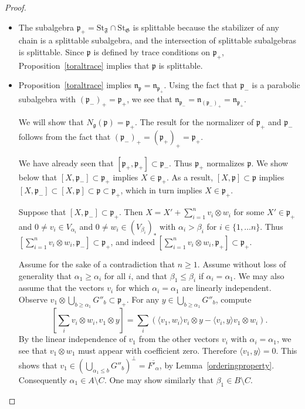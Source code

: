 \documentclass{article}
\newcommand {\St} {\mathrm{St}}
\def\g{\mathfrak {g}}
\def\n{\mathfrak {n}}
\def\p{\mathfrak {p}}
\def\F{\mathfrak{F}}
\def\G{\mathfrak{G}}
\begin{document}
\begin{proof}
\begin{itemize}
\item[(\ref{parta})] The subalgebra $\p_+ = \St_\F \cap \St_\G$ is splittable because the stabilizer of any chain is a splittable subalgebra, and the intersection of splittable subalgebras is splittable.  Since $\p$ is defined by trace conditions on $\p_+$, Proposition~\ref{toraltrace}  implies that $\p$ is splittable.

\item[(\ref{partb})]
Proposition~\ref{toraltrace} implies $\n_\p =  \n_{\p_+}$.  Using the fact that $\p_-$ is a parabolic subalgebra with $(\p_-)_+ = \p_+$, we see that $\n_{\p_-} = \n_{(\p_-)_+} = \n_{\p_+}$.

We will show that $N_\g (\p) = \p_+$.  The result for the normalizer of $\p_+$ and $\p_-$ follows from the fact that $(\p_-)_+ = (\p_+)_+ = \p_+$.

We have already seen that $[\p_+ , \p_+] \subset \p_-$.  Thus $\p_+$ normalizes $\p$.  We show below that $[X , \p_-] \subset \p_+$ implies $X \in \p_+$. 
As a result, $[X , \p] \subset \p$ implies $[X , \p_-] \subset [X, \p] \subset \p \subset \p_+$, which in turn implies $X \in \p_+$.

Suppose that $[X , \p_-] \subset \p_+$.  Then $X = X' + \sum_{i=1}^n v_i \otimes w_i$ for some $X' \in \p_+$ and $0 \neq v_i \in V_{\alpha_i}$ and $0 \neq w_i \in (V_{\beta_i})_*$ with $\alpha_i > \beta_i$ for $i \in \{1 , \ldots n \}$.  Thus $[\sum_{i=1}^n v_i \otimes w_i, \p_-] \subset \p_+$, and indeed
 $[\sum_{i=1}^n v_i \otimes w_i, \p_+] \subset \p_+$.  

Assume for the sake of a contradiction that $n \geq 1$.  Assume without loss of generality that $\alpha_1 \geq \alpha_i$ for all $i$, and that $\beta_1 \leq \beta_i$ if $\alpha_i = \alpha_1$.
We may also assume that the vectors $v_i$ for which $\alpha_i = \alpha_1$ are linearly independent.  Observe $v_1 \otimes \bigcup_{b \geq \alpha_1} G''_b \subset \p_+$.  For any $y \in \bigcup_{b \geq \alpha_1} G''_b$,
compute
$$\left[ \sum_i v_i \otimes w_i , v_1 \otimes y \right] = \sum_i (\langle v_1 , w_i \rangle v_i \otimes y - \langle v_i , y \rangle v_1 \otimes w_i).$$
By the linear independence of $v_1$ from the other vectors $v_i$ with $\alpha_i = \alpha_1$, we see that $v_1 \otimes w_1$ must appear with coefficient zero.  Therefore $\langle v_1 , y \rangle = 0$.  This shows that $v_1 \in (\bigcup_{\alpha_1 \leq b} G''_b)^\perp = \overline{F'_\alpha}$, by Lemma~\ref{orderingproperty}.  Consequently $\alpha_1 \in A \setminus C$.  One may show similarly that $\beta_1 \in B \setminus C$.


\end{itemize}
\end{proof}
\end{document}
